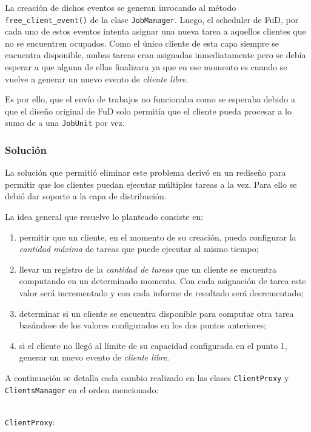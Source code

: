 La creación de dichos eventos se generan invocando al método \texttt{free\_client\_event()} de la clase \texttt{JobManager}. Luego, el scheduler de FuD, por cada uno de estos eventos intenta asignar una nueva tarea a aquellos clientes que no se encuentren ocupados. Como el único cliente de esta capa siempre se encuentra disponible, ambas tareas eran asignadas inmediatamente pero se debía esperar a que alguna de ellas finalizara ya que en ese momento es cuando se vuelve a generar un nuevo evento de \textit{cliente libre}. 

Es por ello, que el envío de trabajos no funcionaba como se esperaba debido a que el diseño original de FuD solo permitía que el cliente pueda procesar a lo sumo de a una \texttt{JobUnit} por vez.

	\subsubsection{Solución}
La solución que permitió eliminar este problema derivó en un rediseño para permitir que los clientes puedan ejecutar múltiples tareas a la vez. Para ello se debió dar soporte a la capa de distribución.

La idea general que resuelve lo planteado consiste en:

\begin{enumerate}
\item permitir que un cliente, en el momento de su creación, pueda configurar la \textit{cantidad máxima} de tareas que puede ejecutar al mismo tiempo;
\item llevar un registro de la \textit{cantidad de tareas} que un cliente se encuentra computando en un determinado momento. Con cada asignación de tarea este valor será incrementado y con cada informe de resultado será decrementado;
\item determinar si un cliente se encuentra disponible para computar otra tarea basándose de los valores configurados en los dos puntos anteriores;
\item si el cliente no llegó al límite de su capacidad configurada en el punto 1, generar un nuevo evento de \textit{cliente libre}.
\end{enumerate}

A continuación se detalla cada cambio realizado en las clases \texttt{ClientProxy} y \texttt{ClientsManager} en el orden mencionado:

\texttt{\\ClientProxy}:\\

